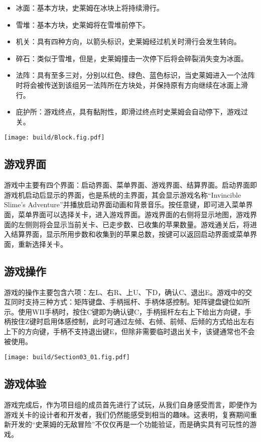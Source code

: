 \begin{itemize}
    \item 冰面：基本方块，史莱姆在冰块上将持续滑行。
    \item 雪堆：基本方块，史莱姆将在雪堆前停下。
    \item 机关：具有四种方向，以箭头标识，史莱姆经过机关时滑行会发生转向。
    \item 碎石：类似于雪堆，但是，史莱姆撞击一次停下后将会碎裂消失变为冰面。
    \item 法阵：具有至多三对，分别以红色、绿色、蓝色标识，当史莱姆进入一个法阵时将会被传送到该组另一法阵所在方块处，并保持原有方向继续在冰面上滑行。
    \item 庇护所：游戏终点，具有黏附性，即滑过终点时史莱姆会自动停下，游戏过关。
\end{itemize}

\begin{Figure}[游戏方块设计]
    \texttt{[image: build/Block.fig.pdf]}
\end{Figure}

\subsection{游戏界面}
游戏中主要有四个界面：启动界面、菜单界面、游戏界面、结算界面。启动界面即游戏机启动后显示的界面，也是系统的主界面，其会显示游戏名称“Invincible Slime's Adventure”并播放启动界面动画和背景音乐。按任意键，即可进入菜单界面，菜单界面可以选择关卡，进入游戏界面。游戏界面的右侧将显示地图，游戏界面的左侧则将会显示当前关卡、已走步数、已收集的苹果数量。游戏通关后，将进入结算界面，显示所用步数和收集到的苹果总数，按键可以返回启动界面或菜单界面，重新选择关卡。

\subsection{游戏操作}
游戏的操作主要包含六项：左L、右R、上U、下D，确认C、退出E。游戏中的交互同时支持三种方式：矩阵键盘、手柄摇杆、手柄体感控制。矩阵键盘键位如所示。使用WII手柄时，按住C键即为确认键C，手柄摇杆左右上下给出方向键，手柄按住Z键时启用体感控制，此时可通过左倾、右倾、前倾、后倾的方式给出左右上下的方向键，手柄不支持退出键E，但除非需要临时退出关卡，该键通常也不会被使用。

\begin{Figure}[键盘操作]
    \texttt{[image: build/Section03\_01.fig.pdf]}
\end{Figure}

\subsection{游戏体验}
游戏完成后，作为项目组的成员首先进行了试玩，从我们自身感受而言，即便作为游戏关卡的设计者和开发者，我们仍然能感受到相当的趣味。这表明，复赛期间重新开发的“史莱姆的无敌冒险”不仅仅再是一个功能验证，而是确实具有可玩性的游戏。

